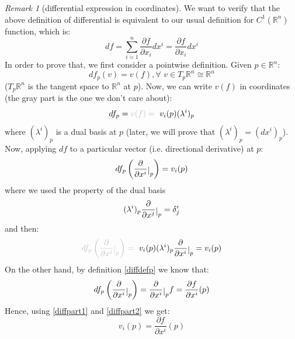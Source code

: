 \documentclass[a4paper,11pt,titlepage]{article}
\numberwithin{equation}{section}
\theoremstyle{definition}
\theoremstyle{remark}
\newtheorem{remark}[theorem]{Remark}
\newcommand{\rfield}{\mathbb{R}}
\newcommand{\restrict}[2]{{#1}\raisebox{-.5ex}{$|$}_{#2}}
\begin{document}
\begin{remark}[differential expression in coordinates]
  We want to verify that the above definition of differential is equivalent to our usual definition for $C^1(\rfield^n)$ function, which is:
  \begin{equation}
    df = \sum\limits_{i=1}^n \frac{\partial f}{\partial x_i} dx^i = \frac{\partial f}{\partial x_i} dx^i
  \end{equation}
  In order to prove that, we first consider a pointwise definition. Given $p \in \rfield^n$:
  \begin{equation} \label{diffdefp}
    df_p(v) = v(f), \forall\,\, v \in T_p \rfield^n \cong \rfield^n
  \end{equation}
  ($T_p \rfield^n$ is the tangent space to $\rfield^n$ at $p$). Now, we can write $v(f)$ in coordinates (the gray part is the one we don't care about):
  \begin{equation} \label{diffcoordinates}
    df_p = \textcolor{lightgray}{v(f) = \text{ }} v_i(p) (\lambda^i)_p
  \end{equation}
  where $(\lambda^i)_p$ is a dual basis at $p$ (later, we will prove that $(\lambda^i)_p = (dx^i)_p$). Now, applying $df$ to a particular vector (i.e. directional derivative) at $p$:
  \begin{equation} \label{diffpart1}
    df_p \left (\restrict{\frac{\partial}{\partial x^i}} {p} \right) = v_i(p)
  \end{equation}
  where we used the property of the dual basis
  \begin{equation}
    (\lambda^i)_p \restrict{\frac{\partial}{\partial x^j}} {p} = \delta^i_j
  \end{equation}
   and then:
   \begin{equation}
   \textcolor{lightgray}{df_p \left (\restrict{\frac{\partial}{\partial x^i}} {p} \right) = \text{ }} v_i(p) (\lambda^i)_p \restrict{\frac{\partial}{\partial x^i}} {p} = v_i(p)
 \end{equation}
   On the other hand, by definition \eqref{diffdefp} we know that:
   \begin{equation} \label{diffpart2}
     df_p \left (\restrict{\frac{\partial}{\partial x^i}} {p} \right)  = \restrict{\frac{\partial}{\partial x^i}} {p} f = \frac{\partial f}{\partial x^i} (p)
   \end{equation}
   Hence, using \eqref{diffpart1} and \eqref{diffpart2} we get:
   \begin{equation}
     v_i (p) = \frac{\partial f}{\partial x^i} (p)
   \end{equation}

\end{remark}
\end{document}
